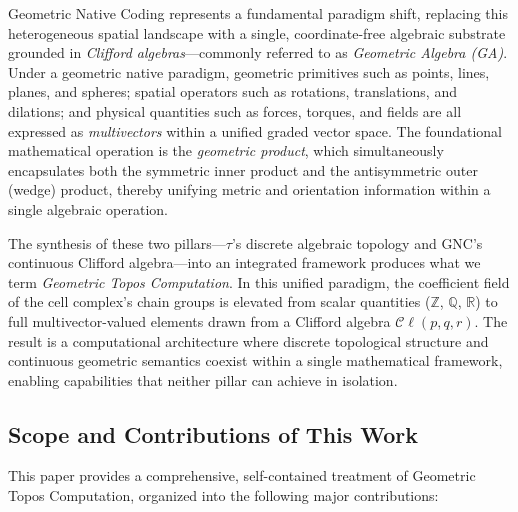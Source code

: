\documentclass[manuscript, nonacm, review=false]{acmart}
\theoremstyle{definition}
\theoremstyle{plain}
\newcommand{\R}{\mathbb{R}}
\newcommand{\Z}{\mathbb{Z}}
\newcommand{\Q}{\mathbb{Q}}
\newcommand{\Cl}{\mathcal{C}\!\ell}
\newcommand{\toposLang}{\ensuremath{\tau}\text{-Lang}}
\begin{document}
Geometric Native Coding represents a fundamental paradigm shift, replacing this heterogeneous spatial landscape with a single, coordinate-free algebraic substrate grounded in \emph{Clifford algebras}---commonly referred to as \emph{Geometric Algebra (GA)}. Under a geometric native paradigm, geometric primitives such as points, lines, planes, and spheres; spatial operators such as rotations, translations, and dilations; and physical quantities such as forces, torques, and fields are all expressed as \emph{multivectors} within a unified graded vector space. The foundational mathematical operation is the \emph{geometric product}, which simultaneously encapsulates both the symmetric inner product and the antisymmetric outer (wedge) product, thereby unifying metric and orientation information within a single algebraic operation.

The synthesis of these two pillars---\toposLang{}'s discrete algebraic topology and GNC's continuous Clifford algebra---into an integrated framework produces what we term \emph{Geometric Topos Computation}. In this unified paradigm, the coefficient field of the cell complex's chain groups is elevated from scalar quantities ($\Z$, $\Q$, $\R$) to full multivector-valued elements drawn from a Clifford algebra $\Cl(p,q,r)$. The result is a computational architecture where discrete topological structure and continuous geometric semantics coexist within a single mathematical framework, enabling capabilities that neither pillar can achieve in isolation.


\subsection{Scope and Contributions of This Work}
\label{subsec:scope}

This paper provides a comprehensive, self-contained treatment of Geometric Topos Computation, organized into the following major contributions:
\end{document}
